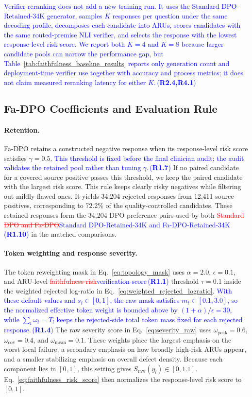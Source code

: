 \documentclass[a4paper,fleqn,doubleblind]{cas-sc}
\DeclareRobustCommand{\deleted}[1]{\textcolor{red}{\sout{#1}}}
\DeclareRobustCommand{\added}[1]{\textcolor{blue}{#1}}
\DeclareRobustCommand{\revtag}[1]{\textcolor{blue}{\scriptsize\,(\textbf{#1})}}
\begin{document}
\added{Verifier reranking does not add a new training run. It uses the Standard DPO-Retained-34K generator, samples $K$ responses per question under the same decoding profile, decomposes each candidate into ARUs, scores candidates with the same routed-premise NLI verifier, and selects the response with the lowest response-level risk score. We report both $K=4$ and $K=8$ because larger candidate pools can narrow the performance gap, but Table~\ref{tab:faithfulness_baseline_results} reports only generation count and deployment-time verifier use together with accuracy and process metrics; it does not claim measured reranking latency for either $K$.}\revtag{R2.4,R4.1}

\subsection{Fa-DPO Coefficients and Evaluation Rule}

\paragraph{Retention.}
Fa-DPO retains a constructed negative response when its response-level risk score satisfies $\gamma=0.5$.
\added{This threshold is fixed before the final clinician audit; the audit validates the retained pool rather than tuning $\gamma$.}\revtag{R1.7}
If no paired candidate for a covered source positive passes this threshold, we keep the paired candidate with the largest risk score.
This rule keeps clearly risky negatives while filtering out mildly flawed ones.
It yields 34,204 rejected responses from 12,411 source positives, corresponding to 72.2\% of the quality-controlled candidates.
These retained responses form the 34,204 DPO preference pairs used by both \deleted{Standard DPO and Fa-DPO}\added{Standard DPO-Retained-34K and Fa-DPO-Retained-34K}\revtag{R1.10} in the matched comparisons.

\paragraph{Token weighting and response severity.}
The token reweighting mask in Eq.~\ref{eq:topology_mask} uses $\alpha=2.0$, $\epsilon=0.1$, and ARU-level \deleted{faithfulness-risk}\added{verification-score}\revtag{R1.1} threshold $\tau=0.1$ inside the weighted rejected log-ratio in Eq.~\ref{eq:weighted_rejected_logratio}. \added{With these default values and $s_i\in[0,1]$, the raw mask satisfies $m_t\in[0.1,3.0]$, so the normalized effective token weight is bounded above by $(1+\alpha)/\epsilon=30$, while $\sum_t\omega_t=T_l$ keeps the rejected-side total token mass fixed for each rejected response.}\revtag{R1.4}
The raw severity score in Eq.~\ref{eq:severity_raw} uses $\omega_{\text{peak}}=0.6$, $\omega_{\text{cov}}=0.4$, and $\omega_{\text{mean}}=0.1$.
These weights place the largest emphasis on the worst local failure, a secondary emphasis on how broadly high-risk ARUs appear, and a smaller stabilizing emphasis on overall defect density.
Because each component lies in $[0,1]$, this setting gives $S_{\text{raw}}(y_l)\in[0,1.1]$.
Eq.~\ref{eq:faithfulness_risk_score} then normalizes the response-level risk score to $[0,1]$.
\end{document}
